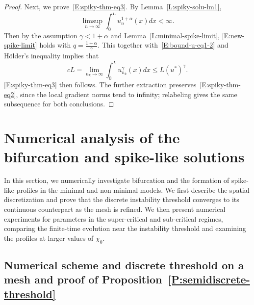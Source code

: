 \documentclass[11pt]{article} %
\theoremstyle{remark}
\theoremstyle{remark}
\numberwithin{equation}{section}
\numberwithin{figure}{section}
\numberwithin{table}{section}
\begin{document}
\begin{proof}
  Next, we prove~\eqref{E:spiky-thm-eq3}. By Lemma~\ref{L:spiky-solu-lm1},
  \[
    \limsup_{n\to\infty} \int_0^L  u_n^{1+\alpha}(x)dx<\infty.
  \]
  Then by the assumption $\gamma < 1 + \alpha$ and
  Lemma~\ref{L:minimal-spike-limit}, \eqref{E:new-spike-limit} holds with $q =
  \frac{1+\alpha}{\gamma}$. This together with~\eqref{E:bound-u-eq1-2} and
  H\"older's inequality implies that
  \[
    cL=\lim_{n_k\to\infty}\int_0^L u_{n_k}^\gamma(x)dx\le L (u^*)^\gamma.
  \]
  \eqref{E:spiky-thm-eq3} then follows. The further extraction
  preserves~\eqref{E:spiky-thm-eq2}, since the local gradient norms tend to
  infinity; relabeling gives the same subsequence for both conclusions.
\end{proof}


\section{Numerical analysis of the bifurcation and spike-like solutions}
\label{SS:bifurcation-numerics}

In this section, we numerically investigate bifurcation and the formation of
spike-like profiles in the minimal and non-minimal models. We first describe the
spatial discretization and prove that the discrete instability threshold
converges to its continuous counterpart as the mesh is refined. We then present
numerical experiments for parameters in the super-critical and sub-critical
regimes, comparing the finite-time evolution near the instability threshold and
examining the profiles at larger values of $\chi_0$.


\subsection{Numerical scheme and discrete threshold on a mesh and proof of Proposition~\ref{P:semidiscrete-threshold}}
\label{SS:numerical-scheme}
\end{document}
